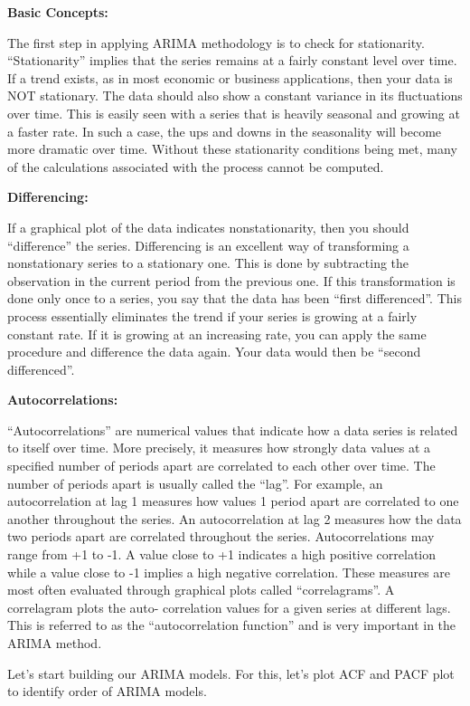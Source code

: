 \documentclass[12pt,openany]{book}
\begin{document}
\textbf{Basic Concepts:}

The first step in applying ARIMA methodology is to check for stationarity. ``Stationarity'' implies that the series remains at a fairly constant level over time. If a trend exists, as in most economic or business applications, then your data is NOT stationary. The data should also show a constant variance in its fluctuations over time. This is easily seen with a series that is heavily seasonal and growing at a faster rate. In such a case, the ups and downs in the seasonality will become more dramatic over time. Without these stationarity conditions being met, many of the calculations associated with the process cannot be computed.

\textbf{Differencing:}

If a graphical plot of the data indicates nonstationarity, then you should ``difference'' the series. Differencing is an excellent way of transforming a nonstationary series to a stationary one. This is done by subtracting the observation in the current period from the previous one. If this transformation is done only once to a series, you say that the data has been ``first differenced''. This process essentially eliminates the trend if your series is growing at a fairly constant rate. If it is growing at an increasing rate, you can apply the same procedure and difference the data again. Your data would then be ``second differenced''.

\textbf{Autocorrelations:}

``Autocorrelations'' are numerical values that indicate how a data series is related to itself over time. More precisely, it measures how strongly data values at a specified number of periods apart are correlated to each other over time. The number of periods apart is usually called the ``lag''. For example, an autocorrelation at lag 1 measures how values 1 period apart are correlated to one another throughout the series. An autocorrelation at lag 2 measures how the data two periods apart are correlated throughout the series. Autocorrelations may range from +1 to -1. A value close to +1 indicates a high positive correlation while a value close to -1 implies a high negative correlation. These measures are most often evaluated through graphical plots called ``correlagrams''. A correlagram plots the auto- correlation values for a given series at different lags. This is referred to as the ``autocorrelation function'' and is very important in the ARIMA method.

Let's start building our ARIMA models. For this, let's plot ACF and PACF plot to identify order of ARIMA models.
\end{document}
